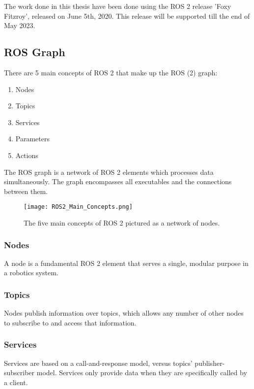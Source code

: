 The work done in this thesis have been done using the ROS 2 release 'Foxy Fitzroy', released on June 5th, 2020. This release will be supported till the end of May 2023. \cite{ros2_distributions}

\subsection{ROS Graph}
There are 5 main concepts of ROS 2 that make up the ROS (2) graph:
\begin{enumerate}
    \item Nodes
    \item Topics
    \item Services
    \item Parameters
    \item Actions
\end{enumerate}

The ROS graph is a network of ROS 2 elements which processes data simultaneously. The graph encompasses all executables and the connections between them.

\begin{figure}[H]
    \centering
    \texttt{[image: ROS2\_Main\_Concepts.png]}
    \caption{The five main concepts of ROS 2 pictured as a network of nodes.}
    \label{fig:ROS 2 main concepts}
\end{figure}

\subsubsection{Nodes}
A node is a fundamental ROS 2 element that serves a single, modular purpose in a robotics system. %

\subsubsection{Topics}
 Nodes publish information over topics, which allows any number of other nodes to subscribe to and access that information. %

\subsubsection{Services}
Services are based on a call-and-response model, versus topics’ publisher-subscriber model. Services only provide data when they are specifically called by a client. %


